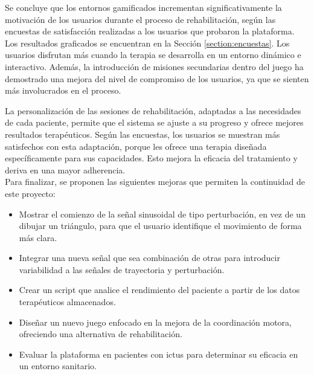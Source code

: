 Se concluye que los entornos gamificados incrementan significativamente la motivación de los usuarios durante el proceso de rehabilitación, según las encuestas de satisfacción realizadas a los usuarios que probaron la plataforma.
Los resultados graficados se encuentran en la Sección \ref{section:encuestas}.
Los usuarios disfrutan más cuando la terapia se desarrolla en un entorno dinámico e interactivo.
Además, la introducción de misiones secundarias dentro del juego ha demostrado una mejora del nivel de compromiso de los usuarios, ya que se sienten más involucrados en el proceso.

La personalización de las sesiones de rehabilitación, adaptadas a las necesidades de cada paciente, permite que el sistema se ajuste a su progreso y ofrece mejores resultados terapéuticos.
Según las encuestas, los usuarios se muestran más satisfechos con esta adaptación, porque les ofrece una terapia diseñada específicamente para sus capacidades.
Esto mejora la eficacia del tratamiento y deriva en una mayor adherencia.\\

Para finalizar, se proponen las siguientes mejoras que permiten la continuidad de este proyecto:
\begin{itemize}
    \item Mostrar el comienzo de la señal sinusoidal de tipo perturbación, en vez de un dibujar un triángulo, para que el usuario identifique el movimiento de forma más clara.
    \item Integrar una nueva señal que sea combinación de otras para introducir variabilidad a las señales de trayectoria y perturbación.
    \item Crear un script que analice el rendimiento del paciente a partir de los datos terapéuticos almacenados. 
    \item Diseñar un nuevo juego enfocado en la mejora de la coordinación motora, ofreciendo una alternativa de rehabilitación.
    \item Evaluar la plataforma en pacientes con ictus para determinar su eficacia en un entorno sanitario.
\end{itemize}\